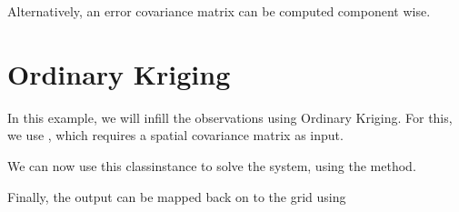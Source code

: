 \documentclass[letterpaper,10pt,english]{sphinxmanual}
\begin{document}
\begin{sphinxVerbatim}[commandchars=\\\{\}]
   
\end{sphinxVerbatim}

\sphinxAtStartPar
Alternatively, an error covariance matrix can be computed component wise.


\section{Ordinary Kriging}
\label{\detokenize{workflow:ordinary-kriging}}
\sphinxAtStartPar
In this example, we will infill the observations using Ordinary Kriging. For this, we use
{\hyperref[\detokenize{kriging:glomar_gridding.kriging.OrdinaryKriging}]{}}, which requires a spatial covariance matrix as
input.

\begin{sphinxVerbatim}[commandchars=\\\{\}]
  
\end{sphinxVerbatim}

\sphinxAtStartPar
We can now use this class\sphinxhyphen{}instance to solve the system, using the  method.

\begin{sphinxVerbatim}[commandchars=\\\{\}]
    
\end{sphinxVerbatim}

\sphinxAtStartPar
Finally, the output can be mapped back on to the grid using
{\hyperref[\detokenize{kriging:glomar_gridding.grid.assign_to_grid}]{}}

\begin{sphinxVerbatim}[commandchars=\\\{\}]
  
\end{sphinxVerbatim}
\end{document}
